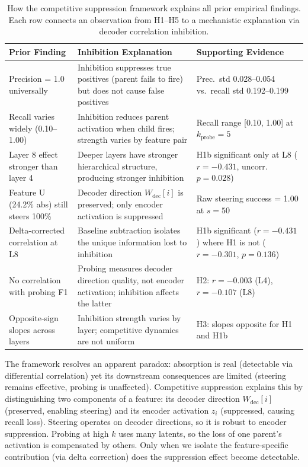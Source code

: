 \documentclass{article}
\begin{document}
\begin{table}[t]
\caption{How the competitive suppression framework explains all prior empirical findings. Each row connects an observation from H1--H5 to a mechanistic explanation via decoder correlation inhibition.}
\label{tab:integration}
\centering
\small
\begin{tabular}{@{}p{3.8cm}p{5.5cm}p{5.0cm}@{}}
\toprule
Prior Finding & Inhibition Explanation & Supporting Evidence \\
\midrule
Precision = 1.0 universally & Inhibition suppresses true positives (parent fails to fire) but does not cause false positives & Prec.\ std 0.028--0.054 vs.\ recall std 0.192--0.199 \\
Recall varies widely (0.10--1.00) & Inhibition reduces parent activation when child fires; strength varies by feature pair & Recall range [0.10, 1.00] at $k_{\text{probe}} = 5$ \\
Layer 8 effect stronger than layer 4 & Deeper layers have stronger hierarchical structure, producing stronger inhibition & H1b significant only at L8 ($r = -0.431$, uncorr.\ $p = 0.028$) \\
Feature U (24.2\% abs) still steers 100\% & Decoder direction $W_{\text{dec}}[i]$ is preserved; only encoder activation is suppressed & Raw steering success = 1.00 at $s = 50$ \\
Delta-corrected correlation at L8 & Baseline subtraction isolates the unique information lost to inhibition & H1b significant ($r = -0.431$) where H1 is not ($r = -0.301$, $p = 0.136$) \\
No correlation with probing F1 & Probing measures decoder direction quality, not encoder activation; inhibition affects the latter & H2: $r = -0.003$ (L4), $r = -0.107$ (L8) \\
Opposite-sign slopes across layers & Inhibition strength varies by layer; competitive dynamics are not uniform & H3: slopes opposite for H1 and H1b \\
\bottomrule
\end{tabular}
\end{table}

The framework resolves an apparent paradox: absorption is real (detectable via differential correlation) yet its downstream consequences are limited (steering remains effective, probing is unaffected). Competitive suppression explains this by distinguishing two components of a feature: its decoder direction $W_{\text{dec}}[i]$ (preserved, enabling steering) and its encoder activation $z_i$ (suppressed, causing recall loss). Steering operates on decoder directions, so it is robust to encoder suppression. Probing at high $k$ uses many latents, so the loss of one parent's activation is compensated by others. Only when we isolate the feature-specific contribution (via delta correction) does the suppression effect become detectable.
\end{document}
